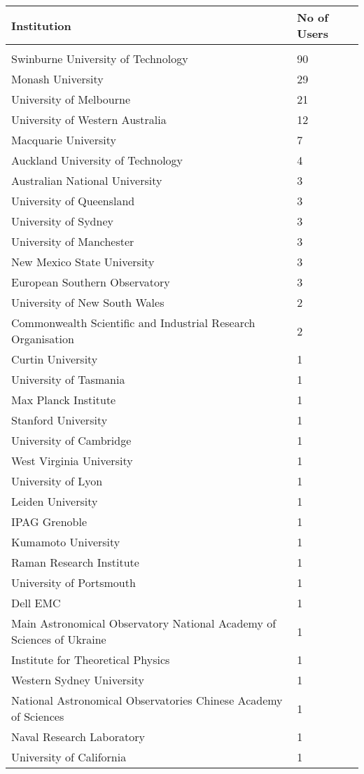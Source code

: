 \documentclass{article}%
\begin{document}
%
\begin{longtabu}{X[l] X[r]}%
\textbf{Institution}&\textbf{No of Users}\\%
\hline%
&\\%
Swinburne University of Technology&90\\%
\hline%
Monash University&29\\%
\hline%
University of Melbourne&21\\%
\hline%
University of Western Australia&12\\%
\hline%
Macquarie University&7\\%
\hline%
Auckland University of Technology&4\\%
\hline%
Australian National University&3\\%
\hline%
University of Queensland&3\\%
\hline%
University of Sydney&3\\%
\hline%
University of Manchester&3\\%
\hline%
New Mexico State University&3\\%
\hline%
European Southern Observatory&3\\%
\hline%
University of New South Wales&2\\%
\hline%
Commonwealth Scientific and Industrial Research Organisation&2\\%
\hline%
Curtin University&1\\%
\hline%
University of Tasmania&1\\%
\hline%
Max Planck Institute&1\\%
\hline%
Stanford University&1\\%
\hline%
University of Cambridge&1\\%
\hline%
West Virginia University&1\\%
\hline%
University of Lyon&1\\%
\hline%
Leiden University&1\\%
\hline%
IPAG Grenoble&1\\%
\hline%
Kumamoto University&1\\%
\hline%
Raman Research Institute&1\\%
\hline%
University of Portsmouth&1\\%
\hline%
Dell EMC&1\\%
\hline%
Main Astronomical Observatory National Academy of Sciences of Ukraine&1\\%
\hline%
Institute for Theoretical Physics&1\\%
\hline%
Western Sydney University&1\\%
\hline%
National Astronomical Observatories Chinese Academy of Sciences&1\\%
\hline%
Naval Research Laboratory&1\\%
\hline%
University of California&1\\%
\hline%
\end{longtabu}%
\end{document}

